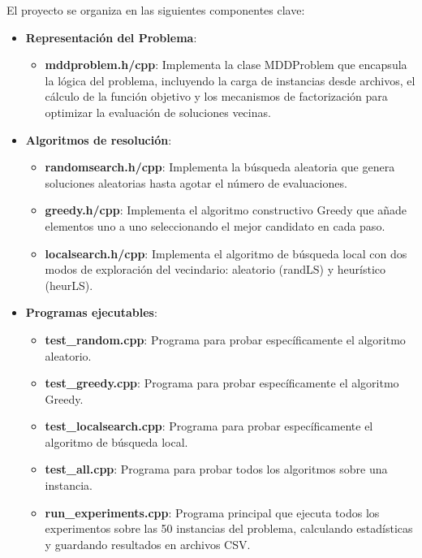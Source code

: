 \documentclass{article}
\begin{document}
El proyecto se organiza en las siguientes componentes clave:

\begin{itemize}
    \item \textbf{Representación del Problema}:
        \begin{itemize}
            \item \textbf{mddproblem.h/cpp}: Implementa la clase MDDProblem que encapsula la lógica del problema, incluyendo la carga de instancias desde archivos, el cálculo de la función objetivo y los mecanismos de factorización para optimizar la evaluación de soluciones vecinas.
        \end{itemize}
    
    \item \textbf{Algoritmos de resolución}:
        \begin{itemize}
            \item \textbf{randomsearch.h/cpp}: Implementa la búsqueda aleatoria que genera soluciones aleatorias hasta agotar el número de evaluaciones.
            \item \textbf{greedy.h/cpp}: Implementa el algoritmo constructivo Greedy que añade elementos uno a uno seleccionando el mejor candidato en cada paso.
            \item \textbf{localsearch.h/cpp}: Implementa el algoritmo de búsqueda local con dos modos de exploración del vecindario: aleatorio (randLS) y heurístico (heurLS).
        \end{itemize}
        
    \item \textbf{Programas ejecutables}:
        \begin{itemize}
            \item \textbf{test\_random.cpp}: Programa para probar específicamente el algoritmo aleatorio.
            \item \textbf{test\_greedy.cpp}: Programa para probar específicamente el algoritmo Greedy.
            \item \textbf{test\_localsearch.cpp}: Programa para probar específicamente el algoritmo de búsqueda local.
            \item \textbf{test\_all.cpp}: Programa para probar todos los algoritmos sobre una instancia.
            \item \textbf{run\_experiments.cpp}: Programa principal que ejecuta todos los experimentos sobre las 50 instancias del problema, calculando estadísticas y guardando resultados en archivos CSV.
        \end{itemize}
\end{itemize}
\end{document}
